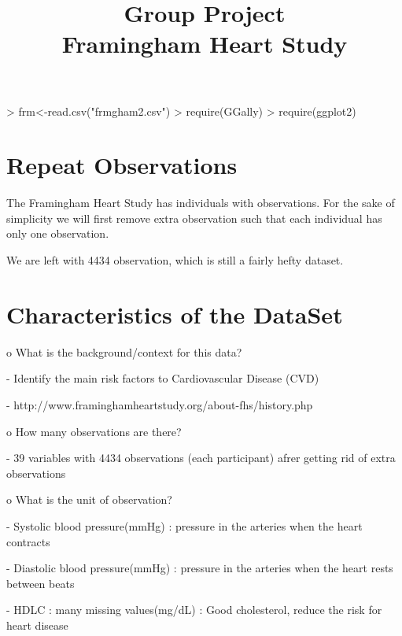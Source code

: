 \documentclass{article}
\begin{document}

\title{Group Project \\ Framingham Heart Study}
\author{}
\maketitle
\begin{Schunk}
\begin{Sinput}
> frm<-read.csv("frmgham2.csv")
> require(GGally)
> require(ggplot2)
\end{Sinput}
\end{Schunk}
\section{Repeat Observations}
The Framingham Heart Study has individuals with observations.  For the sake of simplicity we will first remove extra observation such that each individual has only one observation.
\begin{Schunk}
\end{Schunk}
We are left with 4434 observation, which is still a fairly hefty dataset.

\section{Characteristics of the DataSet}

o  What is the background/context for this data?

- Identify the main risk factors to Cardiovascular Disease (CVD)

- http://www.framinghamheartstudy.org/about-fhs/history.php

o  How many observations are there?

- 39 variables with 4434 observations (each participant) afrer getting rid of 
  extra observations


o	What is the unit of observation?

- Systolic blood pressure(mmHg) 
: pressure in the arteries when the heart contracts 

- Diastolic blood pressure(mmHg) 
: pressure in the arteries when the heart rests between beats

- HDLC : many missing values(mg/dL) 
: Good cholesterol, reduce the risk for heart disease
\end{document}
